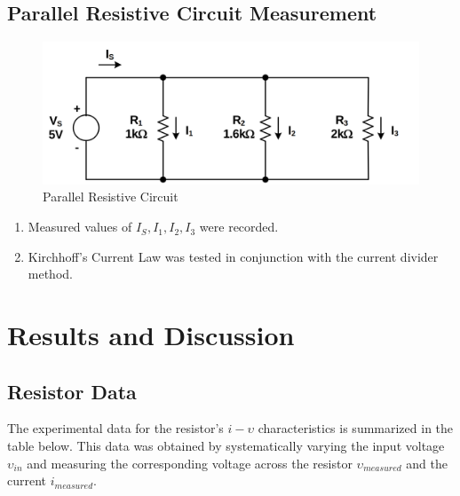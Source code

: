 \documentclass[12pt]{article}
\begin{document}
\subsection{Parallel Resistive Circuit Measurement}

\begin{figure}[H]
	\center
	\includegraphics[scale=.2]{exp4}
	\caption{Parallel Resistive Circuit}
	\label{fig:exp4}
\end{figure}

\begin{enumerate}
	\item Measured values of \( I_S, I_1, I_2, I_3 \) were recorded.
	\item Kirchhoff’s Current Law was tested in conjunction with the current
	      divider method.
\end{enumerate}

\section{Results and Discussion}

\subsection{Resistor Data}
The experimental data for the resistor's \(i-\upsilon\) characteristics is
summarized in the table below. This data was obtained by systematically varying
the input voltage \( \upsilon_{in} \) and measuring the corresponding voltage
across the resistor \( \upsilon_{measured} \) and the current \( i_{measured} \).
\end{document}
